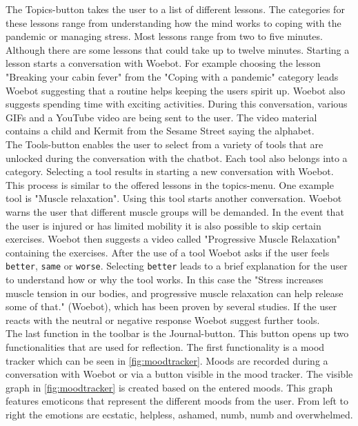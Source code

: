 The Topics-button takes the user to a list of different lessons.
The categories for these lessons range from understanding how the mind works to coping with the pandemic or managing stress.
Most lessons range from two to five minutes.
Although there are some lessons that could take up to twelve minutes.
Starting a lesson starts a conversation with Woebot.
For example choosing the lesson "Breaking your cabin fever" from the "Coping with a pandemic" category leads Woebot suggesting that a routine helps keeping the users spirit up.
Woebot also suggests spending time with exciting activities.
During this conversation, various GIFs and a YouTube video are being sent to the user.
The video material contains a child and Kermit from the Sesame Street saying the alphabet. \\

The Tools-button enables the user to select from a variety of tools that are unlocked during the conversation with the chatbot.
Each tool also belongs into a category.
Selecting a tool results in starting a new conversation with Woebot.
This process is similar to the offered lessons in the topics-menu. One example tool is "Muscle relaxation".
Using this tool starts another conversation. Woebot warns the user that different muscle groups will be demanded.
In the event that the user is injured or has limited mobility it is also possible to skip certain exercises.
Woebot then suggests a video called "Progressive Muscle Relaxation" containing the exercises.
After the use of a tool Woebot asks if the user feels \texttt{better}, \texttt{same} or \texttt{worse}.
Selecting \texttt{better} leads to a brief explanation for the user to understand how or why the tool works.
In this case the "Stress increases muscle tension in our bodies, and progressive muscle relaxation can help release some of that." (Woebot), which has been proven by several studies\cite{progressive-muscle, stress-pmr}.
If the user reacts with the neutral or negative response Woebot suggest further tools.\\

The last function in the toolbar is the Journal-button.
This button opens up two functionalities that are used for reflection.
The first functionality is a mood tracker which can be seen in \autoref{fig:moodtracker}.
Moods are recorded during a conversation with Woebot or via a button visible in the mood tracker.
The visible graph in \autoref{fig:moodtracker} is created based on the entered moods.
This graph features emoticons that represent the different moods from the user. %
From left to right the emotions are ecstatic, helpless, ashamed, numb, numb and overwhelmed.\\

